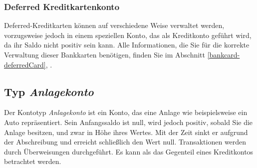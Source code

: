 \subsubsection{Deferred Kreditkartenkonto\label{accounts-type-cash-deferredCards}}
Deferred-Kreditkarten können auf verschiedene Weise verwaltet werden, vorzugsweise jedoch in einem speziellen Konto, das als Kreditkonto geführt wird, da ihr Saldo nicht positiv sein kann.
Alle Informationen, die Sie für die korrekte Verwaltung dieser Bankkarten benötigen, finden Sie im Abschnitt \vref{bankcard-deferredCard}, .


\subsection{Typ \emph{Anlagekonto}\label{accounts-type-assets}}

Der Kontotyp \emph{Anlagekonto} ist ein Konto, das eine Anlage wie beispielsweise ein Auto repräsentiert. Sein Anfangssaldo ist null, wird jedoch positiv, sobald Sie die Anlage besitzen, und zwar in Höhe ihres Wertes. Mit der Zeit sinkt er aufgrund der Abschreibung und erreicht schließlich den Wert null. Transaktionen werden durch Überweisungen durchgeführt. Es kann als das Gegenteil eines Kreditkontos betrachtet werden.

